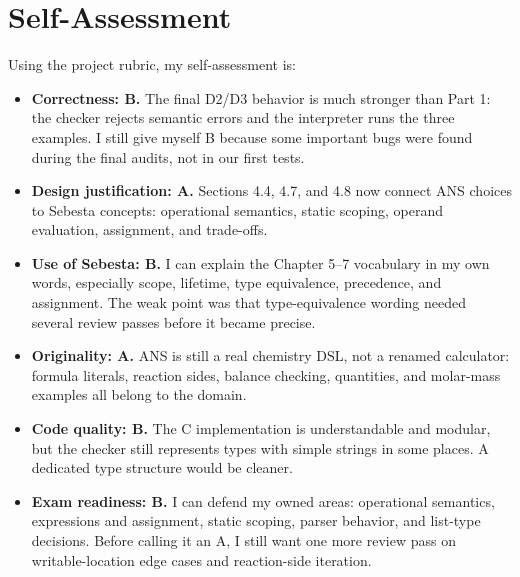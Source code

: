 \documentclass[11pt,a4paper]{article}
\newcommand{\grade}[1]{\textbf{#1}}
\begin{document}
\section{Self-Assessment}

Using the project rubric, my self-assessment is:

\begin{itemize}
  \item \grade{Correctness: B.} The final D2/D3 behavior is much stronger than Part 1: the checker rejects semantic errors and the interpreter runs the three examples. I still give myself B because some important bugs were found during the final audits, not in our first tests.
  \item \grade{Design justification: A.} Sections 4.4, 4.7, and 4.8 now connect ANS choices to Sebesta concepts: operational semantics, static scoping, operand evaluation, assignment, and trade-offs.
  \item \grade{Use of Sebesta: B.} I can explain the Chapter 5--7 vocabulary in my own words, especially scope, lifetime, type equivalence, precedence, and assignment. The weak point was that type-equivalence wording needed several review passes before it became precise.
  \item \grade{Originality: A.} ANS is still a real chemistry DSL, not a renamed calculator: formula literals, reaction sides, balance checking, quantities, and molar-mass examples all belong to the domain.
  \item \grade{Code quality: B.} The C implementation is understandable and modular, but the checker still represents types with simple strings in some places. A dedicated type structure would be cleaner.
  \item \grade{Exam readiness: B.} I can defend my owned areas: operational semantics, expressions and assignment, static scoping, parser behavior, and list-type decisions. Before calling it an A, I still want one more review pass on writable-location edge cases and reaction-side iteration.
\end{itemize}
\end{document}
